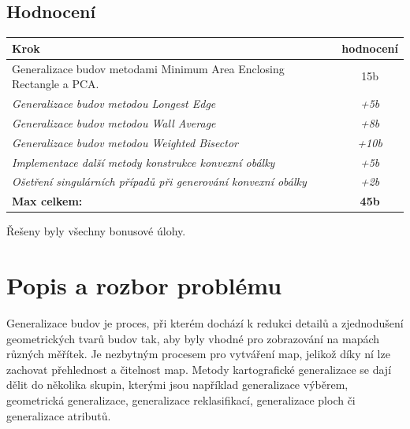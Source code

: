 \documentclass{article}
\begin{document}
\begin{spacing}{1.5}
\subsection*{\textbf{Hodnocení}}
\vspace{0.3cm}
\begin{adjustbox}{width=1\textwidth}
\begin{tabular}{|l|c|}
\hline
\textbf{Krok}                                                                                  & \textbf{hodnocení} \\ \hline
Generalizace budov metodami Minimum Area Enclosing Rectangle a PCA.                                    &  15b              \\ \hline
\textit{Generalizace budov metodou Longest Edge}                    & \textit{+5b}    \\ \hline
\textit{Generalizace budov metodou Wall Average} & \textit{+8b}    \\ \hline
\textit{Generalizace budov metodou Weighted Bisector}   & \textit{+10b}    \\ \hline
\textit{Implementace další metody konstrukce konvexní obálky} & \textit{+5b} \\ \hline
\textit{Ošetření singulárních případů při generování konvexní obálky}                    & \textit{+2b}    \\ \hline
\textbf{Max celkem:}                                                                                  & \textbf{45b} \\ \hline
\end{tabular}
\end{adjustbox}

\vspace{1cm}
\noindent Řešeny byly všechny bonusové úlohy.
\newpage

\section{Popis a rozbor problému}
Generalizace budov je proces, při kterém dochází k redukci detailů a zjednodušení geometrických tvarů budov tak, aby byly vhodné pro zobrazování na mapách různých měřítek. Je nezbytným procesem pro vytváření map, jelikož díky ní lze zachovat přehlednost a čitelnost map. Metody kartografické generalizace se dají dělit do několika skupin, kterými jsou například generalizace výběrem, geometrická generalizace, generalizace reklasifikací, generalizace ploch či generalizace atributů.


\end{spacing}
\end{document}
